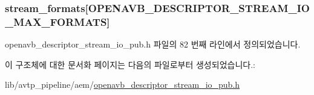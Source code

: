 \subsubsection[{\texorpdfstring{stream\+\_\+formats}{stream_formats}}]{ stream\+\_\+formats\mbox{[}{\bf O\+P\+E\+N\+A\+V\+B\+\_\+\+D\+E\+S\+C\+R\+I\+P\+T\+O\+R\+\_\+\+S\+T\+R\+E\+A\+M\+\_\+\+I\+O\+\_\+\+M\+A\+X\+\_\+\+F\+O\+R\+M\+A\+TS}\mbox{]}}\hypertarget{structopenavb__aem__descriptor__stream__io__t_aea693d8a1d99fa0ba587e052fd8e0175}{}\label{structopenavb__aem__descriptor__stream__io__t_aea693d8a1d99fa0ba587e052fd8e0175}


openavb\+\_\+descriptor\+\_\+stream\+\_\+io\+\_\+pub.\+h 파일의 82 번째 라인에서 정의되었습니다.



이 구조체에 대한 문서화 페이지는 다음의 파일로부터 생성되었습니다.\+:\begin{DoxyCompactItemize}
\item 
lib/avtp\+\_\+pipeline/aem/\hyperlink{openavb__descriptor__stream__io__pub_8h}{openavb\+\_\+descriptor\+\_\+stream\+\_\+io\+\_\+pub.\+h}\end{DoxyCompactItemize}
